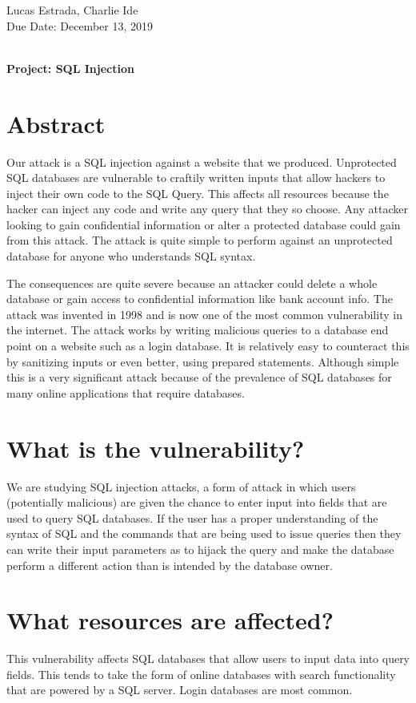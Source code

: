 \documentclass[11pt]{article}
\begin{document}

\noindent
\normalsize Lucas Estrada, Charlie Ide \\
\normalsize   Due Date: December 13, 2019 \\\\
\noindent
\centerline{\Large\textbf{Project: SQL Injection}}

\section*{Abstract}
Our attack is a SQL injection against a website that we produced. Unprotected SQL databases are vulnerable to craftily written inputs that allow hackers to inject their own code to the SQL Query. This affects all resources because the hacker can inject any code and write any query that they so choose. Any attacker looking to gain confidential information or alter a protected database could gain from this attack. The attack is quite simple to perform against an unprotected database for anyone who understands SQL syntax. 

\par The consequences are quite severe because an attacker could delete a whole database or gain access to confidential information like bank account info. The attack was invented in 1998 and is now one of the most common vulnerability in the internet. The attack works by writing malicious queries to a database end point on a website such as a login database. It is relatively easy to counteract this by sanitizing inputs or even better, using prepared statements. Although simple this is a very significant attack because of the prevalence of SQL databases for many online applications that require databases. 

\section*{What is the vulnerability?}
We are studying SQL injection attacks, a form of attack in which users (potentially malicious) are given the chance to enter input into fields that are used to query SQL databases. If the user has a proper understanding of the syntax of SQL and the commands that are being used to issue queries then they can write their input parameters as to hijack the query and make the database perform a different action than is intended by the database owner.

\section*{What resources are affected?}
This vulnerability affects SQL databases that allow users to input data into query fields. This tends to take the form of online databases with search functionality that are powered by a SQL server. Login databases are most common.
\end{document}
